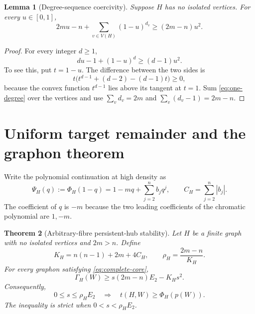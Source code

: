\documentclass[11pt]{article}
\newtheorem{theorem}{Theorem}[section]
\newtheorem{lemma}[theorem]{Lemma}
\begin{document}
\begin{lemma}[Degree-sequence coercivity]
\label{lem:scalar}
Suppose $H$ has no isolated vertices.  For every $u\in[0,1]$,
\begin{equation}
 2mu-n+\sum_{v\in V(H)}(1-u)^{d_v}
 \geq(2m-n)u^2.
 \label{eq:scalar}
\end{equation}
\end{lemma}

\begin{proof}
For every integer $d\geq1$,
\begin{equation}
 du-1+(1-u)^d\geq(d-1)u^2.
 \label{eq:one-degree}
\end{equation}
To see this, put $t=1-u$.  The difference between the two sides is
\[
 t\bigl(t^{d-1}+(d-2)-(d-1)t\bigr)\geq0,
\]
because the convex function $t^{d-1}$ lies above its tangent at $t=1$.
Sum \eqref{eq:one-degree} over the vertices and use
$\sum_vd_v=2m$ and $\sum_v(d_v-1)=2m-n$.
\end{proof}


\section{Uniform target remainder and the graphon theorem}

Write the polynomial continuation at high density as
\begin{equation}
 \Psi_H(q):=\Phi_H(1-q)
 =1-mq+\sum_{j=2}^nb_jq^j,
 \qquad
 C_H=\sum_{j=2}^n|b_j|.
 \label{eq:target-remainder}
\end{equation}
The coefficient of $q$ is $-m$ because the two leading coefficients of the
chromatic polynomial are $1,-m$.

\begin{theorem}[Arbitrary-fibre persistent-hub stability]
\label{thm:hub}
Let $H$ be a finite graph with no isolated vertices and $2m>n$.  Define
\begin{equation}
 K_H=n(n-1)+2m+4C_H,
 \qquad
 \rho_H=\frac{2m-n}{K_H}.
 \label{eq:constants}
\end{equation}
For every graphon satisfying \eqref{eq:complete-core},
\begin{equation}
 \Gamma_H(W)\geq
 s(2m-n)E_2-K_Hs^2.
 \label{eq:main-bound}
\end{equation}
Consequently,
\begin{equation}
 0\leq s\leq\rho_HE_2
 \quad\Longrightarrow\quad
 t(H,W)\geq\Phi_H(p(W)).
 \label{eq:adaptive-radius}
\end{equation}
The inequality is strict when $0<s<\rho_HE_2$.
\end{theorem}
\end{document}
